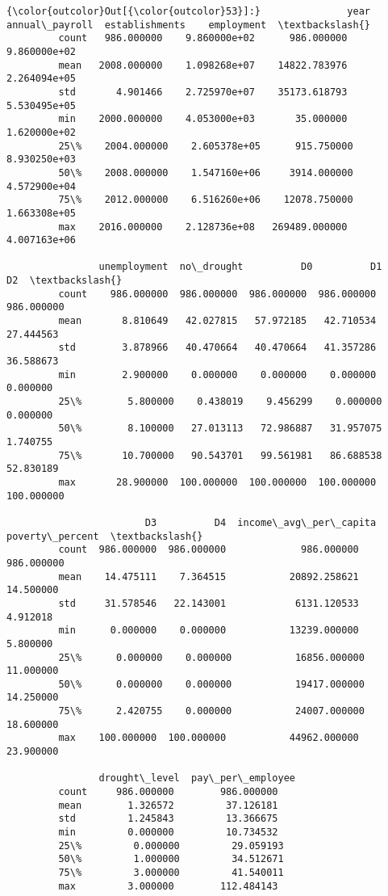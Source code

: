\documentclass[11pt]{article}
\begin{document}
\begin{Verbatim}[commandchars=\\\{\}]
{\color{outcolor}Out[{\color{outcolor}53}]:}               year  annual\_payroll  establishments    employment  \textbackslash{}
         count   986.000000    9.860000e+02      986.000000  9.860000e+02   
         mean   2008.000000    1.098268e+07    14822.783976  2.264094e+05   
         std       4.901466    2.725970e+07    35173.618793  5.530495e+05   
         min    2000.000000    4.053000e+03       35.000000  1.620000e+02   
         25\%    2004.000000    2.605378e+05      915.750000  8.930250e+03   
         50\%    2008.000000    1.547160e+06     3914.000000  4.572900e+04   
         75\%    2012.000000    6.516260e+06    12078.750000  1.663308e+05   
         max    2016.000000    2.128736e+08   269489.000000  4.007163e+06   
         
                unemployment  no\_drought          D0          D1          D2  \textbackslash{}
         count    986.000000  986.000000  986.000000  986.000000  986.000000   
         mean       8.810649   42.027815   57.972185   42.710534   27.444563   
         std        3.878966   40.470664   40.470664   41.357286   36.588673   
         min        2.900000    0.000000    0.000000    0.000000    0.000000   
         25\%        5.800000    0.438019    9.456299    0.000000    0.000000   
         50\%        8.100000   27.013113   72.986887   31.957075    1.740755   
         75\%       10.700000   90.543701   99.561981   86.688538   52.830189   
         max       28.900000  100.000000  100.000000  100.000000  100.000000   
         
                        D3          D4  income\_avg\_per\_capita  poverty\_percent  \textbackslash{}
         count  986.000000  986.000000             986.000000       986.000000   
         mean    14.475111    7.364515           20892.258621        14.500000   
         std     31.578546   22.143001            6131.120533         4.912018   
         min      0.000000    0.000000           13239.000000         5.800000   
         25\%      0.000000    0.000000           16856.000000        11.000000   
         50\%      0.000000    0.000000           19417.000000        14.250000   
         75\%      2.420755    0.000000           24007.000000        18.600000   
         max    100.000000  100.000000           44962.000000        23.900000   
         
                drought\_level  pay\_per\_employee  
         count     986.000000        986.000000  
         mean        1.326572         37.126181  
         std         1.245843         13.366675  
         min         0.000000         10.734532  
         25\%         0.000000         29.059193  
         50\%         1.000000         34.512671  
         75\%         3.000000         41.540011  
         max         3.000000        112.484143  
\end{Verbatim}
            
\end{document}
